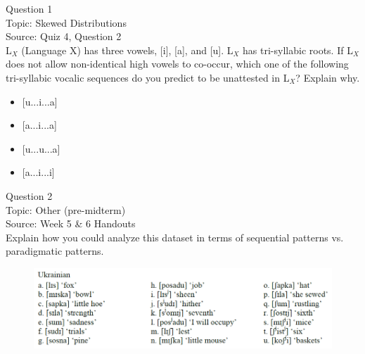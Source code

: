 \documentclass[12pt]{article}
\begin{document}
\begin{center}
\textbf{{\color{blue}{\HUGE START OF EXAM\\}}}

\textbf{{\color{blue}{\HUGE Student ID: 96220\\}}}

\textbf{{\color{blue}{\HUGE 4:40\\}}}

\end{center}
\newpage

{\large Question 1}\\

Topic: Skewed Distributions\\
Source: Quiz 4, Question 2\\

L$_X$ (Language X) has three vowels, [i], [a], and [u]. L$_X$ has tri-syllabic roots. If L$_X$ does not allow non-identical high vowels to co-occur, which one of the following tri-syllabic vocalic sequences do you predict to be unattested in L$_X$? Explain why.\\

\begin{itemize} \item {[u...i...a]} \item {[a...i...a]} \item {[u...u...a]} \item {[a...i...i]} \end{itemize}


\newpage

{\large Question 2}\\

Topic: Other (pre-midterm)\\
Source: Week 5 \& 6 Handouts\\

Explain how you could analyze this dataset in terms of sequential patterns vs. paradigmatic patterns.\\

\begin{figure}[H]
\includegraphics{../images/ukrainian.png}
\end{figure}
\end{document}
